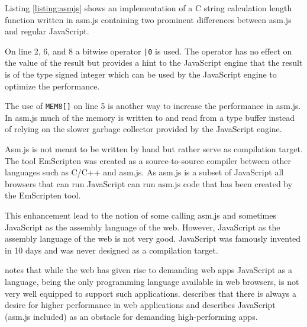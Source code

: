 Listing \ref{listing:asmjs} shows an implementation of a C string calculation length function written in asm.js containing two prominent differences between asm.js and regular JavaScript. 

On line 2, 6, and 8 a bitwise operator \texttt{|0} is used. The operator has no effect on the value of the result but provides a hint to the JavaScript engine that the result is of the type signed integer which can be used by the JavaScript engine to optimize the performance. 

The use of \texttt{MEM8[]} on line 5 is another way to increase the performance in asm.js. In asm.js much of the memory is written to and read from a type buffer instead of relying on the slower garbage collector provided by the JavaScript engine.

Asm.js is not meant to be written by hand but rather serve as compilation target. The tool EmScripten \parencite{Zakai2011} was created as a source-to-source compiler between other languages such as C/C++ and asm.js. As asm.js is a subset of JavaScript all browsers that can run JavaScript can run asm.js code that has been created by the EmScripten tool.

This enhancement lead to the notion of some calling asm.js and sometimes JavaScript as the assembly language of the web. However, JavaScript as the assembly language of the web is not very good. JavaScript was famously invented in 10 days and was never designed as a compilation target.

\textcite{HaasRossbergSchuffTitzerHolmanGohmanWagnerZakaiBastien2017} notes that while the web has given rise to demanding web apps JavaScript as a language, being the only programming language available in web browsers, is not very well equipped to support such applications. \textcite{ReiserBlaser2017} describes that there is always a desire for higher performance in web applications and \textcite{Zakai2018} describes JavaScript (asm.js included) as an obstacle for demanding high-performing apps.









